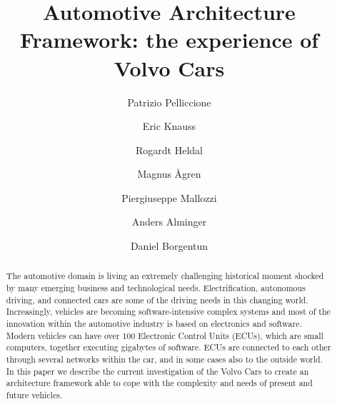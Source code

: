 \documentclass[preprint,12pt,3p]{elsarticle}
\newcommand{\ra}{$\rightarrow$}
\newcommand{\chg}[2]{\textcolor{red}{\sout{#1}}{\ra}\textcolor{blue}{\uline{#2}}} %
\newcommand\patrizio[1]{\nb{Patrizio}{#1}}
\begin{document}
\begin{frontmatter}

\title{Automotive Architecture Framework: the experience of Volvo Cars}




\author[label1]{Patrizio Pelliccione}
\author[label1]{Eric Knauss}
\author[label1]{Rogardt Heldal}
\author[label1]{Magnus \AA gren}
\author[label1]{Piergiuseppe Mallozzi}
\author[label2]{Anders Alminger}
\author[label2]{Daniel Borgentun}

\address[label1]{Chalmers University of Technology $|$ University of Gothenburg, Department of Computer Science and Engineering, Sweden}
\address[label2]{Volvo Cars, Sweden}




\begin{abstract}
The automotive domain is living an extremely challenging historical moment	shocked by many emerging
business and technological needs. Electrification, autonomous driving, and connected cars are some
of the driving needs in this changing world. 
Increasingly, vehicles are becoming software-intensive complex systems and most of the innovation within the automotive industry is based on electronics and software.
Modern vehicles can have over 100 Electronic Control Units (ECUs), which are
small computers, together executing gigabytes of software. ECUs are
connected to each other through several networks within the car, and in some cases also to the outside world. 
In this paper we describe the current investigation of the Volvo Cars to create an 
architecture framework able to cope with the complexity and needs of present and future vehicles.   
\end{abstract}


\end{frontmatter}
\end{document}
